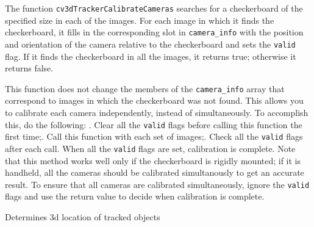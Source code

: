 {The function \texttt{cv3dTrackerCalibrateCameras} searches for a checkerboard of the specified size in each of the images. For each image in which it finds the checkerboard, it fills in the corresponding slot in \texttt{camera\_info} with the position and orientation of the camera relative to the checkerboard and sets the \texttt{valid} flag. If it finds the checkerboard in all the images, it returns true; otherwise it returns false.

This function does not change the members of the \texttt{camera\_info} array that correspond to images in which the checkerboard was not found. This allows you to calibrate each camera independently, instead of simultaneously. To accomplish this, do the following:
\newline
{}. Clear all the \texttt{valid} flags before calling this function the first time;. Call this function with each set of images;. Check all the \texttt{valid} flags after each call. When all the \texttt{valid} flags are set, calibration is complete.
\newline
\newline
Note that this method works well only if the checkerboard is rigidly mounted; if it is handheld, all the cameras should be calibrated simultanously to get an accurate result. To ensure that all cameras are calibrated simultaneously, ignore the \texttt{valid} flags and use the return value to decide when calibration is complete.


Determines 3d location of tracked objects


\begin{description}
\end{description}

}
